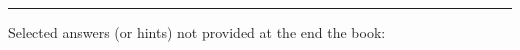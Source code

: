 \documentclass[12pt]{article}
\begin{document}

\rule{500pt}{1pt}
\bigskip


Selected answers (or hints) not provided at the end the book:
\begin{itemize}  %






%
%


\end{itemize}
\end{document}
